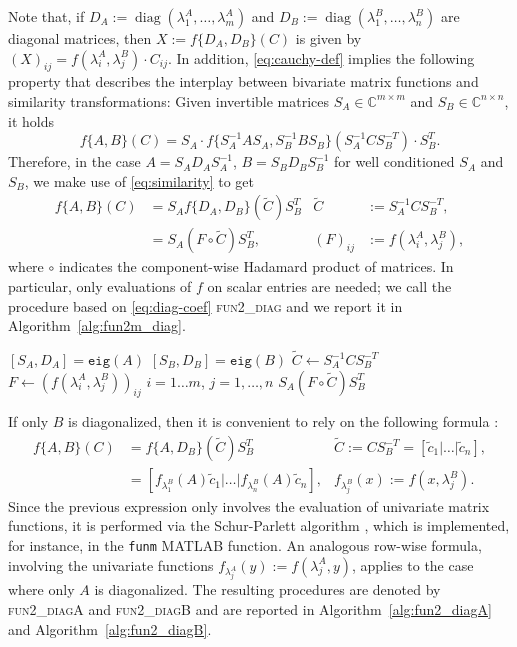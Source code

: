 \documentclass{siamart1116}
\DeclareMathOperator{\diag}{diag}
\begin{document}
  Note that, if $D_A:=\diag(\lambda_1^{A},\dots,\lambda_m^{A})$ and $D_B:=\diag(\lambda_1^{B},\dots,\lambda_n^{B})$ are diagonal matrices, then $X:=f\{D_A,D_B\}(C)$ is given by $(X)_{ij}=f(\lambda_i^A,\lambda_j^B)\cdot C_{ij}$. In addition, \eqref{eq:cauchy-def} implies the following property that describes the interplay between bivariate matrix functions and similarity transformations: Given invertible matrices $S_A\in\mathbb C
^{m\times m}$ and $S_B\in\mathbb C^{n\times n}$, it holds
\begin{equation}\label{eq:similarity}
    f\{A,B\}(C)=S_A\cdot f\{S_A^{-1}AS_A,S_B^{-1}BS_B\}(S_A^{-1}CS_B^{-T})\cdot S_B^{T}.
\end{equation}
  Therefore, in the case $A=S_AD_AS_A^{-1}$, $B=S_BD_BS_B^{-1}$ for well conditioned $S_A$ and $S_B$, we make use of \eqref{eq:similarity} to get
  \begin{equation}\label{eq:diag-coef}
  \begin{aligned}
  f\{A,B\}(C)&= S_Af\{D_A,D_B\}(\widetilde C)S_B^T   &\widetilde C&:=S_A^{-1}CS_B^{-T},\\
  &= S_A(F\circ \widetilde C)S_B^T,  &(F)_{ij}&:=f(\lambda_i^{A},\lambda_j^B),
  \end{aligned}
  \end{equation}
  where $\circ$ indicates the component-wise Hadamard product of matrices. In particular, only evaluations of $f$ on scalar entries are needed; we call the procedure based on \eqref{eq:diag-coef} \textsc{fun2\_diag} and we report it in Algorithm~\ref{alg:fun2m_diag}.
  \begin{algorithm}[H] 
  	\small 
  	\caption{}\label{alg:fun2m_diag}
  	\begin{algorithmic}[1]
  		\State $[S_A, D_A]=\texttt{eig}(A)$
  		\State $[S_B, D_B]=\texttt{eig}(B)$
  		\State $\widetilde C \gets S_A^{-1}CS_B^{-T}$
  		\State $F\gets \left(f(\lambda_i^A,\lambda_j^B)\right)_{ij}$ \quad $i=1\dots m$, $j=1,\dots,n$
  		\State\Return $S_A(F\circ\widetilde C)S_B^T$
  		\EndProcedure
  	\end{algorithmic}
  \end{algorithm} 
If only $B$ is diagonalized, then it is convenient to rely on the following formula \cite[Section 5]{kressner2011bivariate}:
  \begin{align} \label{eq:half-diagonalize}
f\{A,B\}(C)&=f\{A,D_B\}(\widetilde C)S_B^T & \widetilde C:=CS_B^{-T}=[\widetilde c_1|\dots|\widetilde c_n],\\
&=[f_{\lambda_1^B}(A)\widetilde c_1|\dots|f_{\lambda_n^B}(A)\widetilde c_n],&f_{\lambda_j^B}(x):=f(x, \lambda_j^B). \nonumber
  \end{align}
  Since the previous expression only involves the evaluation of univariate matrix functions, it is performed via the Schur-Parlett algorithm \cite{davies2003schur}, which is implemented, for instance, in the \texttt{funm} MATLAB function.
  An analogous row-wise formula, involving the univariate functions $f_{\lambda_j^A}(y):=f(\lambda_j^A,y)$, applies to the case where only $A$ is diagonalized.  The resulting procedures are denoted by \textsc{fun2\_diagA} and \textsc{fun2\_diagB} and are reported in Algorithm~\ref{alg:fun2_diagA} and Algorithm~\ref{alg:fun2_diagB}.
  
\end{document}
